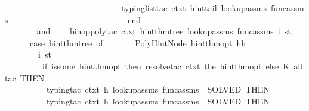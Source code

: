 \begin{isabellebody}
\ \ \ \ \ \ \ \ \ \ \ \ \ \ \ \ \ \ \ \ \ \ \ \ \ \ \ \ {\isacharparenleft}{\kern0pt}typing{\isacharunderscore}{\kern0pt}list{\isacharunderscore}{\kern0pt}tac\ ctxt\ hint{\isacharunderscore}{\kern0pt}tail\ lookup{\isacharunderscore}{\kern0pt}assms\ func{\isacharunderscore}{\kern0pt}assms{\isacharparenright}{\kern0pt}\isanewline
\ \ \ \ \ \ \ \ \ \ \ \ \ \ \ \ \ \ \ \ \ \ \ \ \ \ \ \ end\isanewline
\ \ \ \ \ \ \ \ \ \ \ \ \ \ \ \ \ \ \ \ \ \ \ \ \ \ {\isacharparenright}{\kern0pt}\isanewline
\ \ \ \ \ \ \ {\isacharparenright}{\kern0pt}\isanewline
\ \ \ \ \ \ {\isacharparenright}{\kern0pt}\isanewline
\ and\ \isanewline
\ \ \ binop{\isacharunderscore}{\kern0pt}poly{\isacharunderscore}{\kern0pt}tac\ ctxt\ hint{\isacharunderscore}{\kern0pt}thm{\isacharunderscore}{\kern0pt}tree\ lookup{\isacharunderscore}{\kern0pt}assms\ func{\isacharunderscore}{\kern0pt}assms\ i\ st\ {\isacharequal}{\kern0pt}\ \isanewline
\ \ \ \ \ \ case\ hint{\isacharunderscore}{\kern0pt}thm{\isacharunderscore}{\kern0pt}tree\ of\isanewline
\ \ \ \ \ \ \ PolyHintNode\ {\isacharparenleft}{\kern0pt}hint{\isacharunderscore}{\kern0pt}thm{\isacharunderscore}{\kern0pt}opt{\isacharcomma}{\kern0pt}\ {\isacharbrackleft}{\kern0pt}h{}{\isacharcomma}{\kern0pt}h{}{\isacharbrackright}{\kern0pt}{\isacharparenright}{\kern0pt}\ {\isacharequal}{\kern0pt}{\isachargreater}{\kern0pt}\ \isanewline
\ \ \ \ \ \ \ \ {\isacharparenleft}{\kern0pt}i{\isacharcomma}{\kern0pt}\ st{\isacharparenright}{\kern0pt}\ {\isacharbar}{\kern0pt}{\isacharminus}{\kern0pt}{\isachargreater}{\kern0pt}\isanewline
\ \ \ \ \ \ \ \ {\isacharparenleft}{\kern0pt}\ {\isacharparenleft}{\kern0pt}if\ is{\isacharunderscore}{\kern0pt}some\ hint{\isacharunderscore}{\kern0pt}thm{\isacharunderscore}{\kern0pt}opt\ then\ resolve{\isacharunderscore}{\kern0pt}tac\ ctxt\ {\isacharbrackleft}{\kern0pt}the\ hint{\isacharunderscore}{\kern0pt}thm{\isacharunderscore}{\kern0pt}opt{\isacharbrackright}{\kern0pt}\ else\ K\ all{\isacharunderscore}{\kern0pt}tac{\isacharparenright}{\kern0pt}\ THEN{\isacharprime}{\kern0pt}\isanewline
\ \ \ \ \ \ \ \ \ \ {\isacharparenleft}{\kern0pt}{\isacharparenleft}{\kern0pt}typing{\isacharunderscore}{\kern0pt}tac\ ctxt\ h{}\ lookup{\isacharunderscore}{\kern0pt}assms\ func{\isacharunderscore}{\kern0pt}assms{\isacharparenright}{\kern0pt}\ {\isacharbar}{\kern0pt}{\isachargreater}{\kern0pt}\ SOLVED{\isacharprime}{\kern0pt}{\isacharparenright}{\kern0pt}\ THEN{\isacharprime}{\kern0pt}\isanewline
\ \ \ \ \ \ \ \ \ \ {\isacharparenleft}{\kern0pt}{\isacharparenleft}{\kern0pt}typing{\isacharunderscore}{\kern0pt}tac\ ctxt\ h{}\ lookup{\isacharunderscore}{\kern0pt}assms\ func{\isacharunderscore}{\kern0pt}assms{\isacharparenright}{\kern0pt}\ {\isacharbar}{\kern0pt}{\isachargreater}{\kern0pt}\ SOLVED{\isacharprime}{\kern0pt}{\isacharparenright}{\kern0pt}\ THEN{\isacharprime}{\kern0pt}\ \isanewline

\end{isabellebody}
